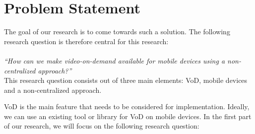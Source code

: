 \section{Problem Statement}
\label{sec:prob_statement}
The goal of our research is to come towards such a solution. The following research question is therefore central for this research:\\
\\
\textit{``How can we make video-on-demand available for mobile devices using a non-centralized approach?''}\\

This research question consists out of three main elements: VoD, mobile devices and a non-centralized approach.

VoD is the main feature that needs to be considered for implementation. Ideally, we can use an existing tool or library for VoD on mobile devices. In the first part of our research, we will focus on the following research question:

